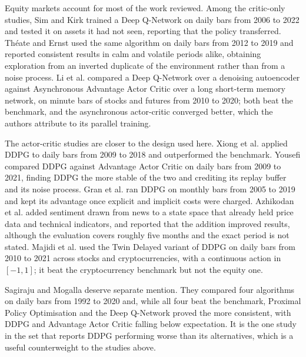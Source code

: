 Equity markets account for most of the work reviewed. Among the critic-only studies, Sim and Kirk \cite{sim_generalized_2023} trained a Deep Q-Network on daily bars from 2006 to 2022 and tested it on assets it had not seen, reporting that the policy transferred. Théate and Ernst \cite{theate_application_2021} used the same algorithm on daily bars from 2012 to 2019 and reported consistent results in calm and volatile periods alike, obtaining exploration from an inverted duplicate of the environment rather than from a noise process. Li et al. \cite{li_deep_2019} compared a Deep Q-Network over a denoising autoencoder against Asynchronous Advantage Actor Critic over a long short-term memory network, on minute bars of stocks and futures from 2010 to 2020; both beat the benchmark, and the asynchronous actor-critic converged better, which the authors attribute to its parallel training.

The actor-critic studies are closer to the design used here. Xiong et al. \cite{xiong_practical_2018} applied DDPG to daily bars from 2009 to 2018 and outperformed the benchmark. Yousefi \cite{yousefi_deep_2022} compared DDPG against Advantage Actor Critic on daily bars from 2009 to 2021, finding DDPG the more stable of the two and crediting its replay buffer and its noise process. Gran et al. \cite{gran_deep_2019} ran DDPG on monthly bars from 2005 to 2019 and kept its advantage once explicit and implicit costs were charged. Azhikodan et al. \cite{saini_stock_2019} added sentiment drawn from news to a state space that already held price data and technical indicators, and reported that the addition improved results, although the evaluation covers roughly five months and the exact period is not stated. Majidi et al. \cite{majidi_algorithmic_2022} used the Twin Delayed variant of DDPG on daily bars from 2010 to 2021 across stocks and cryptocurrencies, with a continuous action in \([-1, 1]\); it beat the cryptocurrency benchmark but not the equity one.

Sagiraju and Mogalla \cite{sagiraju_application_2021} deserve separate mention. They compared four algorithms on daily bars from 1992 to 2020 and, while all four beat the benchmark, Proximal Policy Optimisation and the Deep Q-Network proved the more consistent, with DDPG and Advantage Actor Critic falling below expectation. It is the one study in the set that reports DDPG performing worse than its alternatives, which is a useful counterweight to the studies above.

